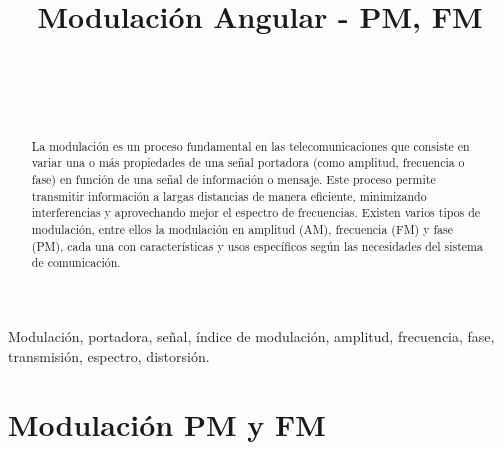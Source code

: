\documentclass[conference]{IEEEtran}
\begin{document}
	
	\title{Modulación Angular - PM, FM}
	\author{
		\\
		\\
		\\
		\and
		\and
		\and
	}
	
	\maketitle
	\begin{abstract}
		La modulación es un proceso fundamental en las telecomunicaciones que consiste en variar una o más propiedades de una señal portadora (como amplitud, frecuencia o fase) en función de una señal de información o mensaje. Este proceso permite transmitir información a largas distancias de manera eficiente, minimizando interferencias y aprovechando mejor el espectro de frecuencias. Existen varios tipos de modulación, entre ellos la modulación en amplitud (AM), frecuencia (FM) y fase (PM), cada una con características y usos específicos según las necesidades del sistema de comunicación.
		
	\end{abstract}
	
	\begin{IEEEkeywords}
		Modulación, portadora, señal, índice de modulación, amplitud, frecuencia, fase, transmisión, espectro, distorsión.
	\end{IEEEkeywords}
	
	\section{Modulación PM y FM}
	
\end{document}
